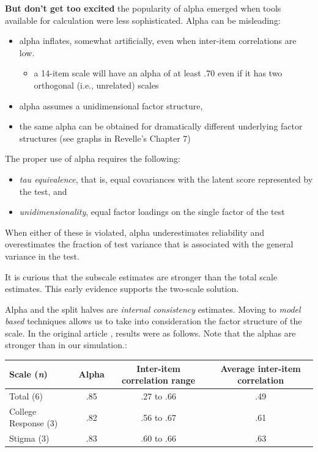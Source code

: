 \documentclass[
  english,
]{book}
\providecommand{\tightlist}{%
  \setlength{\itemsep}{0pt}\setlength{\parskip}{0pt}}
\begin{document}
\textbf{But don't get too excited} the popularity of alpha emerged when tools available for calculation were less sophisticated. Alpha can be misleading:

\begin{itemize}
\tightlist
\item
  alpha inflates, somewhat artificially, even when inter-item correlations are low.

  \begin{itemize}
  \tightlist
  \item
    a 14-item scale will have an alpha of at least .70 even if it has two orthogonal (i.e., unrelated) scales \citep{cortina_what_1993}
  \end{itemize}
\item
  alpha assumes a unidimensional factor structure,
\item
  the same alpha can be obtained for dramatically different underlying factor structures (see graphs in Revelle's Chapter 7)
\end{itemize}

The proper use of alpha requires the following:

\begin{itemize}
\tightlist
\item
  \emph{tau equivalence}, that is, equal covariances with the latent score represented by the test, and
\item
  \emph{unidimensionality}, equal factor loadings on the single factor of the test
\end{itemize}

When either of these is violated, alpha underestimates reliability and overestimates the fraction of test variance that is associated with the general variance in the test.

It is curious that the subscale estimates are stronger than the total scale estimates. This early evidence supports the two-scale solution.

Alpha and the split halves are \emph{internal consistency} estimates. Moving to \emph{model based} techniques allows us to take into consideration the factor structure of the scale. In the original article \citep{szymanski_perceptions_2020}, results were as follows. Note that the alphas are stronger than in our simulation.:

\begin{longtable}[]{@{}lccc@{}}
\toprule
Scale (\emph{n}) & Alpha & Inter-item correlation range & Average inter-item correlation\tabularnewline
\midrule
\endhead
Total (6) & .85 & .27 to .66 & .49\tabularnewline
College Response (3) & .82 & .56 to .67 & .61\tabularnewline
Stigma (3) & .83 & .60 to .66 & .63\tabularnewline
\bottomrule
\end{longtable}
\end{document}
